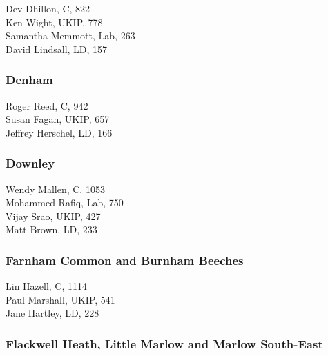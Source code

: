 \documentclass[a4paper,openany,10pt]{book}
\begin{document}


Dev Dhillon, C, 822\\
Ken Wight, UKIP, 778\\
Samantha Memmott, Lab, 263\\
David Lindsall, LD, 157\\


\subsubsection*{Denham}



Roger Reed, C, 942\\
Susan Fagan, UKIP, 657\\
Jeffrey Herschel, LD, 166\\


\subsubsection*{Downley}



Wendy Mallen, C, 1053\\
Mohammed Rafiq, Lab, 750\\
Vijay Srao, UKIP, 427\\
Matt Brown, LD, 233\\


\subsubsection*{Farnham Common and Burnham Beeches}



Lin Hazell, C, 1114\\
Paul Marshall, UKIP, 541\\
Jane Hartley, LD, 228\\


\subsubsection*{Flackwell Heath, Little Marlow and Marlow South-East}

\end{document}
